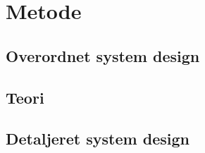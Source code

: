 \section{Metode}

\subsection{Overordnet system design}

\subsection{Teori}


\subsection{Detaljeret system design}


% 